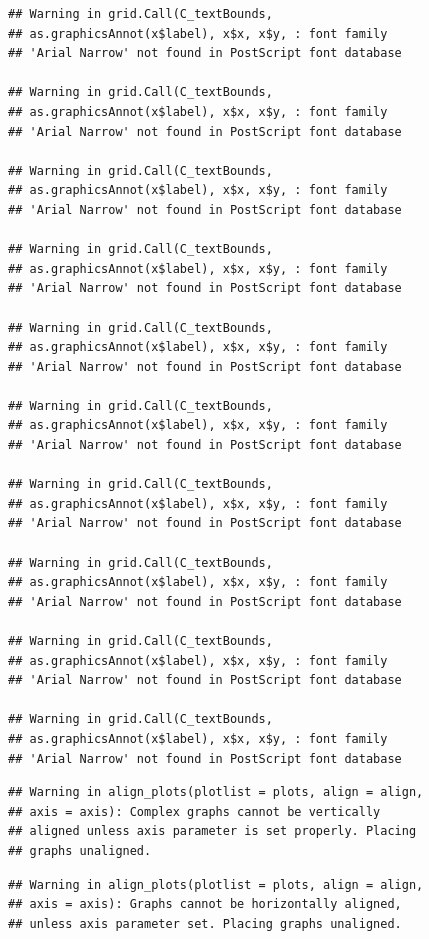 \documentclass[]{krantz}
\theoremstyle{definition}
\theoremstyle{definition}
\theoremstyle{definition}
\theoremstyle{remark}
\begin{document}
\begin{verbatim}
## Warning in grid.Call(C_textBounds,
## as.graphicsAnnot(x$label), x$x, x$y, : font family
## 'Arial Narrow' not found in PostScript font database

## Warning in grid.Call(C_textBounds,
## as.graphicsAnnot(x$label), x$x, x$y, : font family
## 'Arial Narrow' not found in PostScript font database

## Warning in grid.Call(C_textBounds,
## as.graphicsAnnot(x$label), x$x, x$y, : font family
## 'Arial Narrow' not found in PostScript font database

## Warning in grid.Call(C_textBounds,
## as.graphicsAnnot(x$label), x$x, x$y, : font family
## 'Arial Narrow' not found in PostScript font database

## Warning in grid.Call(C_textBounds,
## as.graphicsAnnot(x$label), x$x, x$y, : font family
## 'Arial Narrow' not found in PostScript font database

## Warning in grid.Call(C_textBounds,
## as.graphicsAnnot(x$label), x$x, x$y, : font family
## 'Arial Narrow' not found in PostScript font database

## Warning in grid.Call(C_textBounds,
## as.graphicsAnnot(x$label), x$x, x$y, : font family
## 'Arial Narrow' not found in PostScript font database

## Warning in grid.Call(C_textBounds,
## as.graphicsAnnot(x$label), x$x, x$y, : font family
## 'Arial Narrow' not found in PostScript font database

## Warning in grid.Call(C_textBounds,
## as.graphicsAnnot(x$label), x$x, x$y, : font family
## 'Arial Narrow' not found in PostScript font database

## Warning in grid.Call(C_textBounds,
## as.graphicsAnnot(x$label), x$x, x$y, : font family
## 'Arial Narrow' not found in PostScript font database
\end{verbatim}

\begin{verbatim}
## Warning in align_plots(plotlist = plots, align = align,
## axis = axis): Complex graphs cannot be vertically
## aligned unless axis parameter is set properly. Placing
## graphs unaligned.
\end{verbatim}

\begin{verbatim}
## Warning in align_plots(plotlist = plots, align = align,
## axis = axis): Graphs cannot be horizontally aligned,
## unless axis parameter set. Placing graphs unaligned.
\end{verbatim}
\end{document}
